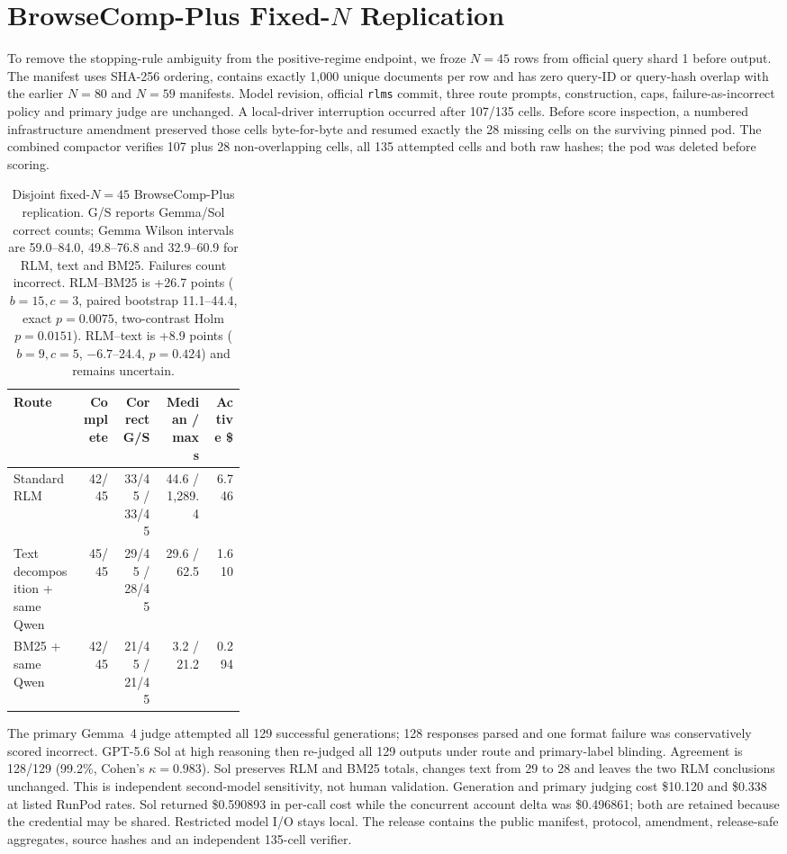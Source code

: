 \FloatBarrier
\section{BrowseComp-Plus Fixed-$N$ Replication}

To remove the stopping-rule ambiguity from the positive-regime endpoint, we
froze $N{=}45$ rows from official query shard 1 before output. The manifest
uses SHA-256 ordering, contains exactly 1,000 unique documents per row and has
zero query-ID or query-hash overlap with the earlier $N{=}80$ and $N{=}59$
manifests. Model revision, official \texttt{rlms} commit, three route prompts,
construction, caps, failure-as-incorrect policy and primary judge are
unchanged. A local-driver interruption occurred after 107/135 cells. Before
score inspection, a numbered infrastructure amendment preserved those cells
byte-for-byte and resumed exactly the 28 missing cells on the surviving
pinned pod. The combined compactor verifies 107 plus 28 non-overlapping cells,
all 135 attempted cells and both raw hashes; the pod was deleted before
scoring.

\begin{table}[!t]
\centering
\small
\setlength{\tabcolsep}{3pt}
\begin{tabular}{@{}L{0.30\linewidth}rrrr@{}}
\toprule
\textbf{Route} & \textbf{Complete} & \textbf{Correct G/S} & \textbf{Median / max s} & \textbf{Active \$} \\
\midrule
Standard RLM & 42/45 & 33/45 / 33/45 & 44.6 / 1,289.4 & 6.746 \\
Text decomposition + same Qwen & 45/45 & 29/45 / 28/45 & 29.6 / 62.5 & 1.610 \\
BM25 + same Qwen & 42/45 & 21/45 / 21/45 & 3.2 / 21.2 & 0.294 \\
\bottomrule
\end{tabular}
\caption{Disjoint fixed-$N{=}45$ BrowseComp-Plus replication. G/S reports Gemma/Sol correct counts; Gemma Wilson intervals are 59.0--84.0, 49.8--76.8 and 32.9--60.9 for RLM, text and BM25. Failures count
incorrect. RLM--BM25 is +26.7 points ($b{=}15,c{=}3$, paired bootstrap
11.1--44.4, exact $p{=}0.0075$, two-contrast Holm $p{=}0.0151$).
RLM--text is +8.9 points ($b{=}9,c{=}5$, $-6.7$--24.4,
$p{=}0.424$) and remains uncertain.}
\label{tab:supp-browsecomp-fixed-n45}
\end{table}

The primary Gemma~4 judge attempted all 129 successful generations; 128
responses parsed and one format failure was conservatively scored incorrect.
GPT-5.6 Sol at high reasoning then re-judged all 129 outputs under route and
primary-label blinding. Agreement is 128/129 (99.2\%, Cohen's
$\kappa{=}0.983$). Sol preserves RLM and BM25 totals, changes text from 29 to
28 and leaves the two RLM conclusions unchanged. This is independent
second-model sensitivity, not human validation. Generation and primary
judging cost \$10.120 and \$0.338 at listed RunPod rates. Sol returned
\$0.590893 in per-call cost while the concurrent account delta was \$0.496861;
both are retained because the credential may be shared. Restricted model I/O
stays local. The release contains the public manifest, protocol, amendment,
release-safe aggregates, source hashes and an independent 135-cell verifier.

